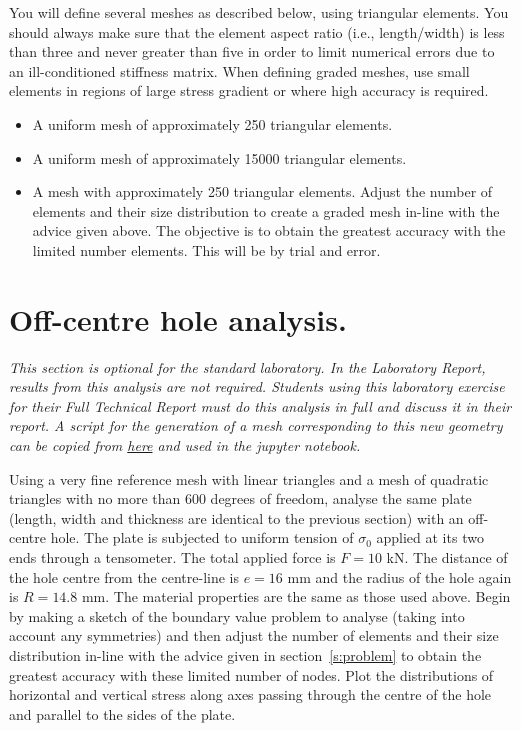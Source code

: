 \documentclass[11pt,a4paper]{article}
\begin{document}
You will define several meshes as described below, using triangular elements. You should always make sure that the element aspect ratio (i.e., length/width) is less than three and never greater than five in order to limit numerical errors due to an ill-conditioned stiffness matrix. When defining graded meshes, use small elements in regions of large stress gradient or where high accuracy is required.
%
\begin{itemize}
\item A uniform mesh of approximately 250 triangular elements. %
\item A uniform mesh of approximately 15000 triangular elements.
\item A mesh with approximately 250 triangular elements. 
Adjust the number of elements and their size distribution to create a graded mesh in-line with the advice given above. The objective is to obtain the greatest accuracy with the limited number elements. This will be by trial and error.
\end{itemize}
%


%
\section{Off-centre hole analysis.}
%

\textit{This section is optional for the standard laboratory. In the Laboratory Report, results
from this analysis are not required. Students using this laboratory exercise for their Full
Technical Report must do this analysis in full and discuss it in their report. A script for the generation of a mesh corresponding to this new geometry can be copied from \href{https://colab.research.google.com/drive/1yq9W1eROgwRJ4edqrcT-De5lSOtPlowS?usp=sharing}{here} and used in the jupyter notebook.}

Using a very fine reference mesh with linear triangles and a mesh of quadratic triangles
with no more than 600 degrees of freedom, analyse the same plate (length, width and thickness are identical to the previous section) with
an off-centre hole. The plate is subjected to uniform tension of $\sigma_0$ applied at its two ends through a tensometer. The total applied force is $F=10$ kN. The distance
of the hole centre from the centre-line is $e = 16$ mm and the radius of the hole again
is $R = 14.8$ mm. The material properties are the same as those used above. Begin
by making a sketch of the boundary value problem to analyse (taking into account any
symmetries) and then adjust the number of elements and their size distribution in-line
with the advice given in section~\ref{s:problem} to obtain the greatest accuracy with these limited
number of nodes. Plot the distributions of horizontal and vertical stress along axes passing through the
centre of the hole and parallel to the sides of the plate.
\end{document}
